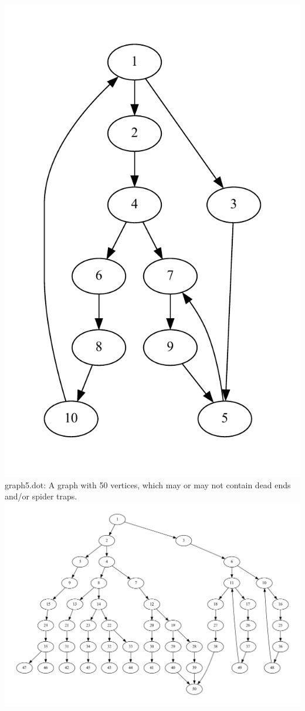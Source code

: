 \documentclass[9pt,twoside]{exam}
\begin{document}
\begin{center}
\includegraphics[scale=0.5]{graph4.pdf} \\
graph5.dot: A graph with 50 vertices, which may or may not contain dead ends and/or spider traps. \\
\includegraphics[scale=0.5]{graph5.pdf} \\
\end{center}
\end{document}
